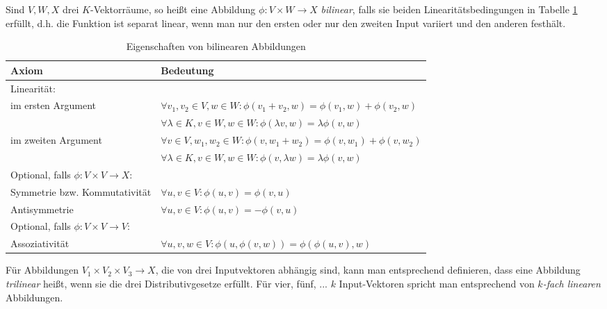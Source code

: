 \begin{definition}\label{bilineare_abb:def}
Sind $V,W,X$ drei $K$-Vektorräume, so heißt eine Abbildung $\phi: V\times W\to X$ \emph{bilinear}, falls sie beiden Linearitätsbedingungen in Tabelle \ref{bilineare_abb:def_table} erfüllt, d.h. die Funktion ist separat linear, wenn man nur den ersten oder nur den zweiten Input variiert und den anderen festhält.

\begin{table}[!ht]
    \setlength\extrarowheight{10pt} %
    \hspace{-0.1\textwidth}
    \begin{tabularx}{1.2\textwidth}{p{6.5cm} p{9.5cm}}
        \toprule
        \textbf{Axiom}                  & \textbf{Bedeutung} \hspace{0.5cm} \\ 
        \midrule
        Linearität: \\
        \hspace{1cm}im ersten Argument  & $\forall v_1,v_2\in V, w\in W: \phi(v_1+v_2,w) = \phi(v_1,w) + \phi(v_2,w)$ \\
                                        & $\forall \lambda\in K, v\in W, w\in W: \phi(\lambda v, w) = \lambda \phi(v,w)$ \\
        \hspace{1cm}im zweiten Argument & $\forall v\in V, w_1, w_2\in W: \phi(v,w_1+w_2) = \phi(v,w_1) + \phi(v,w_2)$ \\
                                        & $\forall \lambda\in K, v\in W, w\in W: \phi(v, \lambda w) = \lambda \phi(v,w)$ \\
        Optional, falls $\phi: V\times V \to X$: \\
        \hspace{1cm}Symmetrie bzw. Kommutativität & $\forall u,v\in V: \phi(u,v) = \phi(v,u)$ \\
        \hspace{1cm}Antisymmetrie & $\forall u,v\in V: \phi(u,v) = -\phi(v,u)$ \\
        Optional, falls $\phi: V\times V\to V$: \\
        \hspace{1cm}Assoziativität & $\forall u,v,w\in V: \phi(u,\phi(v,w)) = \phi(\phi(u,v),w)$ \\
        \bottomrule
    \end{tabularx}
    \label{bilineare_abb:def_table}
    \caption{Eigenschaften von bilinearen Abbildungen}
\end{table}

Für Abbildungen $V_1\times V_2\times V_3\to X$, die von drei Inputvektoren abhängig sind, kann man entsprechend definieren, dass eine Abbildung \emph{trilinear} heißt, wenn sie die drei Distributivgesetze erfüllt. Für vier, fünf, ... $k$ Input-Vektoren spricht man entsprechend von \emph{$k$-fach linearen} Abbildungen.
\end{definition}

